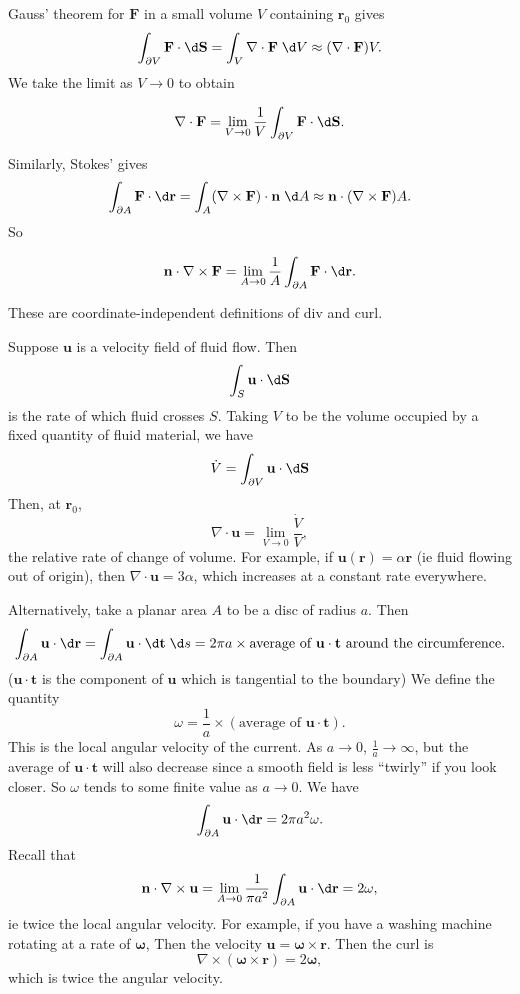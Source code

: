 \documentclass[a4paper]{article}
\begin{document}
Gauss' theorem for $\mathbf{F}$ in a small volume $V$ containing $\mathbf{r}_0$ gives
\[
  \int_{\partial V}\mathbf{F}\cdot \d \mathbf{S} = \int_V\nabla\cdot \mathbf{F}\;\d V\approx (\nabla\cdot \mathbf{F})V.
\]
We take the limit as $V\to 0$ to obtain
\begin{prop}
  \[
    \nabla \cdot \mathbf{F} = \lim_{V \to 0} \frac{1}{V}\int_{\partial V}\mathbf{F}\cdot \d \mathbf{S}.
  \]
\end{prop}
Similarly, Stokes' gives
\[
  \int _{\partial A}\mathbf{F}\cdot \d \mathbf{r} = \int_A(\nabla\times \mathbf{F})\cdot \mathbf{n}\;\d A \approx \mathbf{n}\cdot (\nabla\times \mathbf{F})A.
\]
So
\begin{prop}
  \[
    \mathbf{n}\cdot \nabla \times \mathbf{F} = \lim_{A \to 0}\frac{1}{A}\int_{\partial A}\mathbf{F}\cdot \d \mathbf{r}.
  \]
\end{prop}
These are coordinate-independent definitions of div and curl.

\begin{eg}
  Suppose $\mathbf{u}$ is a velocity field of fluid flow. Then
  \[
    \int_S \mathbf{u}\cdot \d \mathbf{S}
  \]
  is the rate of which fluid crosses $S$. Taking $V$ to be the volume occupied by a fixed quantity of fluid material, we have
  \[
    \dot{V} = \int_{\partial V}\mathbf{u}\cdot \d \mathbf{S}
  \]
  Then, at $\mathbf{r}_0$,
  \[
    \nabla\cdot \mathbf{u} = \lim_{V\to 0}\frac{\dot{V}}{V},
  \]
  the relative rate of change of volume. For example, if $\mathbf{u}(\mathbf{r}) = \alpha\mathbf{r}$ (ie fluid flowing out of origin), then $\nabla\cdot \mathbf{u} = 3\alpha$, which increases at a constant rate everywhere.

  Alternatively, take a planar area $A$ to be a disc of radius $a$. Then
  \[
    \int_{\partial A}\mathbf{u}\cdot \d \mathbf{r} = \int_{\partial A}\mathbf{u}\cdot \d \mathbf{t} \;\d s = 2\pi a \times \text{average of $\mathbf{u}\cdot \mathbf{t}$ around the circumference}.
  \]
  ($\mathbf{u}\cdot \mathbf{t}$ is the component of $\mathbf{u}$ which is tangential to the boundary) We define the quantity
  \[
    \omega = \frac{1}{a} \times (\text{average of }\mathbf{u}\cdot \mathbf{t}).
  \]
  This is the local angular velocity of the current. As $a \to 0$, $\frac{1}{a} \to \infty$, but the average of $\mathbf{u}\cdot \mathbf{t}$ will also decrease since a smooth field is less ``twirly'' if you look closer. So $\omega$ tends to some finite value as $a\to 0$. We have
  \[
    \int_{\partial A} \mathbf{u}\cdot \d \mathbf{r} = 2\pi a^2 \omega.
  \]
  Recall that
  \[
    \mathbf{n}\cdot \nabla \times \mathbf{u} = \lim_{A \to 0}\frac{1}{\pi a^2}\int_{\partial A}\mathbf{u}\cdot \d \mathbf{r} = 2\omega,
  \]
  ie twice the local angular velocity. For example, if you have a washing machine rotating at a rate of $\boldsymbol\omega$, Then the velocity $\mathbf{u} = \boldsymbol\omega\times \mathbf{r}$. Then the curl is
  \[
    \nabla\times (\boldsymbol\omega\times \mathbf{r}) = 2\boldsymbol\omega,
  \]
  which is twice the angular velocity.
\end{eg}
\end{document}
